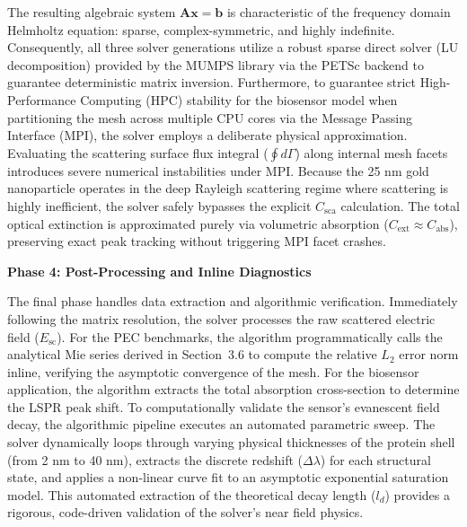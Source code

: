 The resulting algebraic system $\bm{A}\bm{x}=\bm{b}$ is characteristic of the frequency domain Helmholtz equation: sparse, complex-symmetric, and highly indefinite. Consequently, all three solver generations utilize a robust sparse direct solver (LU decomposition) provided by the MUMPS library via the PETSc backend to guarantee deterministic matrix inversion. Furthermore, to guarantee strict High-Performance Computing (HPC) stability for the biosensor model when partitioning the mesh across multiple CPU cores via the Message Passing Interface (MPI), the solver employs a deliberate physical approximation. Evaluating the scattering surface flux integral ($\oint d\Gamma$) along internal mesh facets introduces severe numerical instabilities under MPI. Because the 25 nm gold nanoparticle operates in the deep Rayleigh scattering regime where scattering is highly inefficient, the solver safely bypasses the explicit $C_{\text{sca}}$ calculation. The total optical extinction is approximated purely via volumetric absorption ($C_{\text{ext}} \approx C_{\text{abs}}$), preserving exact peak tracking without triggering MPI facet crashes.

\vspace{12pt}

\noindent\textbf{Phase 4: Post-Processing and Inline Diagnostics}

\vspace{6pt}

The final phase handles data extraction and algorithmic verification. Immediately following the matrix resolution, the solver processes the raw scattered electric field ($E_{\text{sc}}$). For the PEC benchmarks, the algorithm programmatically calls the analytical Mie series derived in Section~3.6 to compute the relative $L_2$ error norm inline, verifying the asymptotic convergence of the mesh. For the biosensor application, the algorithm extracts the total absorption cross-section to determine the LSPR peak shift. To computationally validate the sensor's evanescent field decay, the algorithmic pipeline executes an automated parametric sweep. The solver dynamically loops through varying physical thicknesses of the protein shell (from 2 nm to 40 nm), extracts the discrete redshift ($\Delta\lambda$) for each structural state, and applies a non-linear curve fit to an asymptotic exponential saturation model. This automated extraction of the theoretical decay length ($l_d$) provides a rigorous, code-driven validation of the solver's near field physics.